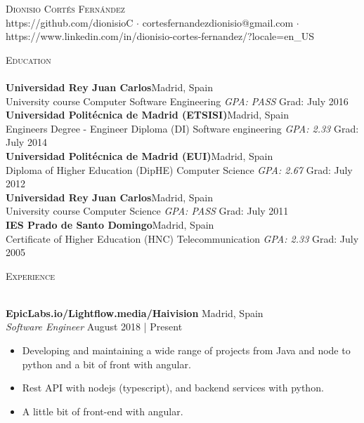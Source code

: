 \documentclass[a4paper]{article}
\newcommand{\lineunder} {
    \vspace*{-8pt} \\
    \hspace*{-18pt} \hrulefill \\
}
\newcommand{\header} [1] {
    {\hspace*{-18pt}\vspace*{6pt} \textsc{#1}}
    \vspace*{-6pt} \lineunder
}
\begin{document}
\vspace*{-40pt}

\vspace*{-10pt}
\begin{center}
	{\Huge \scshape {Dionisio Cort\'es Fern\'andez}}\\
	https://github.com/dionisioC $\cdot$ cortesfernandezdionisio@gmail.com $\cdot$ https://www.linkedin.com/in/dionisio-cortes-fernandez/?locale=en\_US\\
\end{center}

\vspace*{2mm}

\header{Education}
\textbf{Universidad Rey Juan Carlos}\hfill Madrid, Spain\\
University course Computer Software Engineering \textit{GPA: PASS} \hfill Grad: July 2016\\
\vspace{2mm}
\textbf{Universidad Polit\'ecnica de Madrid (ETSISI)}\hfill Madrid, Spain\\
Engineer\textquotesingle s Degree  - Engineer Diploma (DI) Software engineering \textit{GPA: 2.33} \hfill Grad: July 2014\\
\vspace{2mm}
\textbf{Universidad Polit\'ecnica de Madrid (EUI)}\hfill Madrid, Spain\\
Diploma of Higher Education (DipHE) Computer Science \textit{GPA: 2.67} \hfill Grad: July 2012\\
\vspace{2mm}
\textbf{Universidad Rey Juan Carlos}\hfill Madrid, Spain\\
University course Computer Science \textit{GPA: PASS} \hfill Grad: July 2011\\
\vspace{2mm}
\textbf{IES Prado de Santo Domingo}\hfill Madrid, Spain\\
Certificate of Higher Education (HNC) Telecommunication \textit{GPA: 2.33} \hfill Grad: July 2005\\
\vspace{2mm}

\vspace*{2mm}

\header{Experience}
\vspace{1mm}


\textbf{EpicLabs.io/Lightflow.media/Haivision} \hfill Madrid, Spain\\
\textit{Software Engineer} \hfill August 2018 | Present\\
\vspace{-1mm}
\begin{itemize} \itemsep 1pt
    \item Developing and maintaining a wide range of projects from Java and node to python and a bit of front with angular.
    \item Rest API with nodejs (typescript), and backend services with python.
    \item A little bit of front-end with angular.
\end{itemize}
\end{document}
